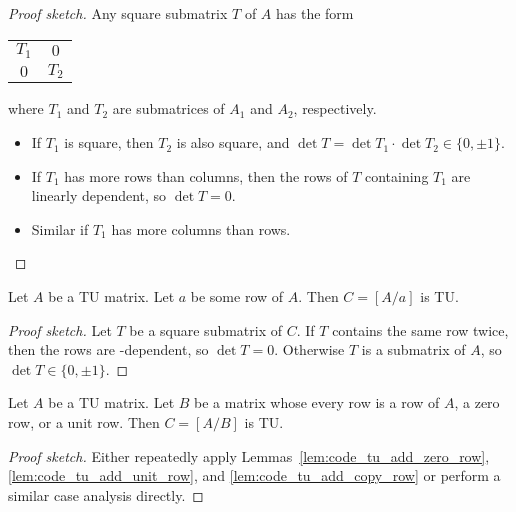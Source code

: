 \begin{proof}[Proof sketch]
  Any square submatrix $T$ of $A$ has the form
  \begin{tabular}{cc}
    \cline{1-2}
    \multicolumn{1}{|c|}{$T_{1}$} & \multicolumn{1}{c|}{    $0$} \\ \cline{1-2}
    \multicolumn{1}{|c|}{    $0$} & \multicolumn{1}{c|}{$T_{2}$} \\ \cline{1-2}
  \end{tabular}
  where $T_{1}$ and $T_{2}$ are submatrices of $A_{1}$ and $A_{2}$, respectively.
  \begin{itemize}
    \item If $T_{1}$ is square, then $T_{2}$ is also square, and $\det T = \det T_{1} \cdot \det T_{2} \in \{0, \pm 1\}$.
    \item If $T_{1}$ has more rows than columns, then the rows of $T$ containing $T_{1}$ are linearly dependent, so $\det T = 0$.
    \item Similar if $T_{1}$ has more columns than rows.
  \end{itemize}
\end{proof}

\begin{lemma}
  \label{lem:code_tu_add_copy_row}
  Let $A$ be a TU matrix. Let $a$ be some row of $A$. Then $C = \left[ A / a \right]$ is TU.
\end{lemma}

\begin{proof}[Proof sketch]
  Let $T$ be a square submatrix of $C$. If $T$ contains the same row twice, then the rows are \GFtwo-dependent, so $\det T = 0$. Otherwise $T$ is a submatrix of $A$, so $\det T \in \{0, \pm 1\}$.
\end{proof}

\begin{lemma}
  \label{lem:code_tu_add_ok_rows}
  Let $A$ be a TU matrix. Let $B$ be a matrix whose every row is a row of $A$, a zero row, or a unit row. Then $C = \left[ A / B \right]$ is TU.
\end{lemma}

\begin{proof}[Proof sketch]
  Either repeatedly apply Lemmas~\ref{lem:code_tu_add_zero_row}, \ref{lem:code_tu_add_unit_row}, and \ref{lem:code_tu_add_copy_row}
  or perform a similar case analysis directly.
\end{proof}

